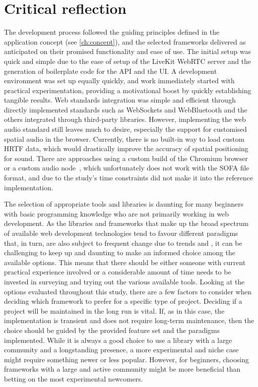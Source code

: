 \section{Critical reflection}
\label{sec:critical-evaluation}

The development process followed the guiding principles defined in the application concept (see \autoref{ch:concept}), and the selected frameworks delivered as anticipated on their promised functionality and ease of use.
The initial setup was quick and simple due to the ease of setup of the LiveKit \ac{WebRTC} server and the generation of boilerplate code for the \ac{API} and the \ac{UI}.
A development environment was set up equally quickly, and work immediately started with practical experimentation, providing a motivational boost by quickly establishing tangible results.
Web standards integration was simple and efficient through directly implemented standards such as WebSockets and WebBluetooth and the others integrated through third-party libraries.
However, implementing the web audio standard still leaves much to desire, especially the support for customised spatial audio in the browser.
Currently, there is no built-in way to load custom \ac{HRTF} data, which would drastically improve the accuracy of spatial positioning for sound.
There are approaches using a custom build of the Chromium browser~\parencite{chromiumCustomHrtf} or a custom audio node~\parencite{customHrtfAudioNode}, which unfortunately does not work with the \ac{SOFA} file format, and due to the study's time constraints did not make it into the reference implementation.

The selection of appropriate tools and libraries is daunting for many beginners with basic programming knowledge who are not primarily working in web development.
As the libraries and frameworks that make up the broad spectrum of available web development technologies tend to favour different paradigms that, in turn, are also subject to frequent change due to trends and , it can be challenging to keep up and daunting to make an informed choice among the available options.
This means that there should be either someone with current practical experience involved or a considerable amount of time needs to be invested in surveying and trying out the various available tools.
Looking at the options evaluated throughout this study, there are a few factors to consider when deciding which framework to prefer for a specific type of project.
Deciding if a project will be maintained in the long run is vital.
If, as in this case, the implementation is transient and does not require long-term maintenance, then the choice should be guided by the provided feature set and the paradigms implemented.
While it is always a good choice to use a library with a large community and a longstanding presence, a more experimental and niche case might require something newer or less popular.
However, for beginners, choosing frameworks with a large and active community might be more beneficial than betting on the most experimental newcomers.

